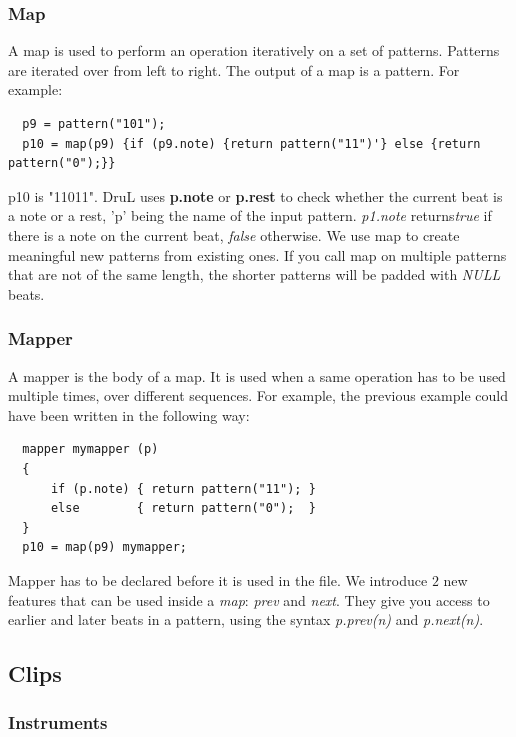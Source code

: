\documentclass[11pt,twoside]{article}
\begin{document}
\subsubsection{Map}
A map is used to perform an operation iteratively on a set of patterns.
Patterns are iterated over from left to right. The output of a map is
a pattern. For example:
\begin{verbatim}
  p9 = pattern("101");
  p10 = map(p9) {if (p9.note) {return pattern("11")'} else {return  pattern("0");}}
\end{verbatim}
p10 is "11011". DruL uses \textbf{p.note} or \textbf{p.rest} to check whether
the current beat is a note or a rest, 'p' being the name of the input pattern.
\textit{p1.note} returns\textit{true} if there is a note on the current beat, 
\textit{false} otherwise. We use map to create meaningful new patterns from 
existing ones. If you call map on multiple patterns that are not of the same
length, the shorter patterns will be padded with \textit{NULL} beats.


\subsubsection{Mapper}
A mapper is the body of a map. It is used when a same operation has to be
used multiple times, over different sequences.
For example, the previous example could have been written in the following
way:
\begin{verbatim}
  mapper mymapper (p)
  {
      if (p.note) { return pattern("11"); }
      else        { return pattern("0");  }
  }
  p10 = map(p9) mymapper;
\end{verbatim}
Mapper has to be declared before it is used in the file.
We introduce $2$ new features that can be used inside a \textit{map}:
\textit{prev} and \textit{next}. They give you access to earlier
and later beats in a pattern, using the syntax \textit{p.prev(n)} and
\textit{p.next(n)}. 


\subsection{Clips}

\subsubsection{Instruments}
\end{document}
